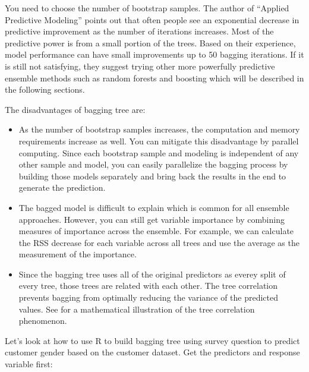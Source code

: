 \documentclass[
  12pt,
]{krantz}
\makeatletter
\newenvironment{Shaded}{\begin{snugshade}}{\end{snugshade}}
\newcommand{\CommentTok}[1]{\textcolor[rgb]{0.37,0.37,0.37}{\textit{#1}}}
\newcommand{\FunctionTok}[1]{\textcolor[rgb]{0,0,0}{#1}}
\newcommand{\NormalTok}[1]{#1}
\newcommand{\OtherTok}[1]{\textcolor[rgb]{0.37,0.37,0.37}{#1}}
\newcommand{\SpecialCharTok}[1]{\textcolor[rgb]{0,0,0}{#1}}
\newcommand{\StringTok}[1]{\textcolor[rgb]{0.5,0.5,0.5}{#1}}
\newenvironment{kframe}{%
\medskip{}
\setlength{\fboxsep}{.8em}
 \def\at@end@of@kframe{}%
 \ifinner\ifhmode%
  \def\at@end@of@kframe{\end{minipage}}%
  \begin{minipage}{\columnwidth}%
 \fi\fi%
 \def\FrameCommand##1{\hskip\@totalleftmargin \hskip-\fboxsep
 \colorbox{shadecolor}{##1}\hskip-\fboxsep
     \hskip-\linewidth \hskip-\@totalleftmargin \hskip\columnwidth}%
 \MakeFramed {\advance\hsize-\width
   \@totalleftmargin\z@ \linewidth\hsize
   \@setminipage}}%
 {\par\unskip\endMakeFramed%
 \at@end@of@kframe}
\renewenvironment{Shaded}{\begin{kframe}}{\end{kframe}}
\makeatother
\begin{document}
You need to choose the number of bootstrap samples. The author of ``Applied Predictive Modeling'' \citep{APM} points out that often people see an exponential decrease in predictive improvement as the number of iterations increases. Most of the predictive power is from a small portion of the trees. Based on their experience, model performance can have small improvements up to 50 bagging iterations. If it is still not satisfying, they suggest trying other more powerfully predictive ensemble methods such as random forests and boosting which will be described in the following sections.

The disadvantages of bagging tree are:

\begin{itemize}
\item
  As the number of bootstrap samples increases, the computation and memory requirements increase as well. You can mitigate this disadvantage by parallel computing. Since each bootstrap sample and modeling is independent of any other sample and model, you can easily parallelize the bagging process by building those models separately and bring back the results in the end to generate the prediction.
\item
  The bagged model is difficult to explain which is common for all ensemble approaches. However, you can still get variable importance by combining measures of importance across the ensemble. For example, we can calculate the RSS decrease for each variable across all trees and use the average as the measurement of the importance.
\item
  Since the bagging tree uses all of the original predictors as everey split of every tree, those trees are related with each other. The tree correlation prevents bagging from optimally reducing the variance of the predicted values. See \citep{Hastie2008} for a mathematical illustration of the tree correlation phenomenon.
\end{itemize}

Let's look at how to use R to build bagging tree using survey question to predict customer gender based on the customer dataset. Get the predictors and response variable first:

\begin{Shaded}
\end{Shaded}
\end{document}
